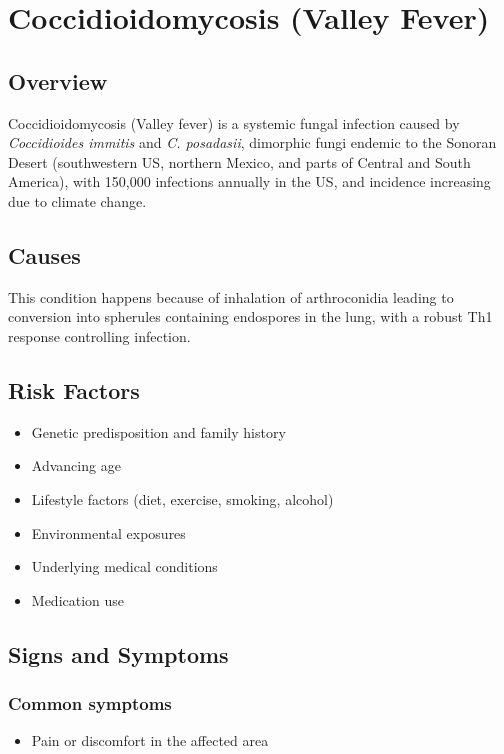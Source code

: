 \chapter{Coccidioidomycosis (Valley Fever)}
\label{sec:Coccidioidomycosis}

\section{Overview}
Coccidioidomycosis (Valley fever) is a systemic fungal infection caused by \textit{Coccidioides immitis} and \textit{C. posadasii}, dimorphic fungi endemic to the Sonoran Desert (southwestern US, northern Mexico, and parts of Central and South America), with 150,000 infections annually in the US, and incidence increasing due to climate change.
\section{Causes}
This condition happens because of inhalation of arthroconidia leading to conversion into spherules containing endospores in the lung, with a robust Th1 response controlling infection.     
\section{Risk Factors}

\begin{itemize}[noitemsep]
  \item Genetic predisposition and family history
  \item Advancing age
  \item Lifestyle factors (diet, exercise, smoking, alcohol)
  \item Environmental exposures
  \item Underlying medical conditions
  \item Medication use
\end{itemize}
\section{Signs and Symptoms}

\subsection{Common symptoms}
\begin{itemize}[noitemsep]
  \item Pain or discomfort in the affected area
  \end{itemize}

